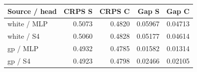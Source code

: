 \begin{tabular}{lrrrr}
\toprule
Source / head & CRPS S & CRPS C & Gap S & Gap C \\
\midrule
white / MLP & 0.5073 & 0.4820 & 0.05967 & 0.04713 \\
white / S4 & 0.5060 & 0.4828 & 0.05177 & 0.04614 \\
gp / MLP & 0.4932 & 0.4785 & 0.01582 & 0.01314 \\
gp / S4 & 0.4923 & 0.4798 & 0.02466 & 0.02105 \\
\bottomrule
\end{tabular}
